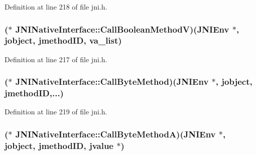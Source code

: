 Definition at line 218 of file jni.\-h.

\hypertarget{struct_j_n_i_native_interface_a0a88a2f1b988eed0404055066a3b8d0f}{
\subsubsection[{Call\-Boolean\-Method\-V}]{($\ast$ J\-N\-I\-Native\-Interface\-::\-Call\-Boolean\-Method\-V)({\bf J\-N\-I\-Env} $\ast$, {\bf jobject}, {\bf jmethod\-I\-D}, va\-\_\-list)}}\label{struct_j_n_i_native_interface_a0a88a2f1b988eed0404055066a3b8d0f}


Definition at line 217 of file jni.\-h.

\hypertarget{struct_j_n_i_native_interface_ac6770ee84c4ef52b537cd05ed4c9c399}{
\subsubsection[{Call\-Byte\-Method}]{($\ast$ J\-N\-I\-Native\-Interface\-::\-Call\-Byte\-Method)({\bf J\-N\-I\-Env} $\ast$, {\bf jobject}, {\bf jmethod\-I\-D},...)}}\label{struct_j_n_i_native_interface_ac6770ee84c4ef52b537cd05ed4c9c399}


Definition at line 219 of file jni.\-h.

\hypertarget{struct_j_n_i_native_interface_a1cf3ffc5655b9ab93c5d225a17bc9a1e}{
\subsubsection[{Call\-Byte\-Method\-A}]{($\ast$ J\-N\-I\-Native\-Interface\-::\-Call\-Byte\-Method\-A)({\bf J\-N\-I\-Env} $\ast$, {\bf jobject}, {\bf jmethod\-I\-D}, {\bf jvalue} $\ast$)}}\label{struct_j_n_i_native_interface_a1cf3ffc5655b9ab93c5d225a17bc9a1e}


